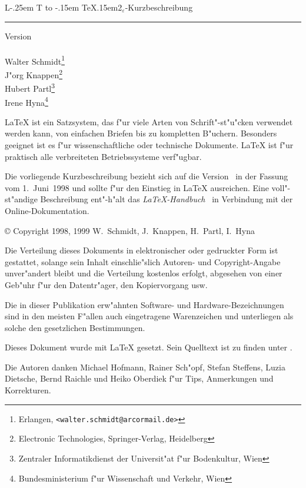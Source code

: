 \documentclass[11pt,a4paper]{article} %
\makeatletter
\DeclareRobustCommand{\sbLaTeXe}{{\fontseries{sbc}\selectfont\boldmath%
        L\kern-.25em%
        {\sbox\z@ T%
         \vbox to\ht\z@{\hbox{\check@mathfonts
                              \fontsize\sf@size\z@
                              \math@fontsfalse\selectfont
                              A}%
                        \vss}%
        }%
        \kern-.15em%
        \TeX\kern.15em2$_{\textstyle\varepsilon}$}}
\newcommand{\manual}{\emph{\LaTeX-Handbuch}~\cite{manual}}
\makeatother
\begin{document}
\begin{titlepage} %
\renewcommand{\thefootnote}{\fnsymbol{footnote}}
{\Huge%
\selectfont
\raggedright
\sbLaTeXe-Kurzbeschreibung
\rule{\textwidth}{0.75pt}
\par
}
\begin{flushleft}
  \normalsize
  \selectfont
  Version \lkver\\
  \lkdate\\[2ex]
  Walter Schmidt\footnote{%
    Erlangen, \texttt{<walter.schmidt@arcormail.de>}}\\
  J"org Knappen\footnote{%
    Electronic Technologies, Springer-Verlag, Heidelberg}\\
  Hubert Partl\footnote{%
    Zentraler Informatikdienst der Universit"at f"ur Bodenkultur, Wien}\\
  Irene Hyna\footnote{%
    Bundesministerium f"ur Wissenschaft und Verkehr, Wien}
\end{flushleft}

\vfill

{\parindent=0cm
\LaTeX{} ist ein Satzsystem, das f"ur viele Arten von
Schrift"-st"u"cken verwendet werden kann, von einfachen Briefen bis zu
kompletten B"uchern.  Besonders geeignet ist es f"ur 
wissenschaftliche oder technische Dokumente. \LaTeX{} ist f"ur 
praktisch alle verbreiteten Betriebssysteme verf"ugbar.
 
Die vorliegende Kurzbeschreibung bezieht sich auf die Version
\LaTeXe\ in der Fassung vom 1.\ Juni~1998 und sollte f"ur den 
Einstieg in \LaTeX{} ausreichen.  
Eine voll"-st"andige Beschreibung ent"-h"alt das \manual{}
in Verbindung mit der Online-Dokumentation.
}
\setcounter{footnote}{0}
\end{titlepage}


{\parindent=0cm\thispagestyle{empty}
\copyright{} Copyright 1998, 1999 W.~Schmidt, J.~Knappen, H.~Partl, I.~Hyna
\bigskip

Die Verteilung dieses Dokuments in elektronischer oder gedruckter
Form ist gestattet, solange sein Inhalt einschlie"slich Autoren- und 
Copyright-Angabe unver"andert bleibt und die Verteilung kostenlos
erfolgt, abgesehen von einer Ge\-b"uhr f"ur den Datentr"ager, den
Kopiervorgang usw.
\bigskip

Die in dieser Publikation erw"ahnten Software- und Hardware-Bezeichnungen sind
in den meisten F"allen auch eingetragene Warenzeichen und unterliegen als
solche den gesetzlichen Bestimmungen.
\bigskip

\vfill

Dieses Dokument wurde mit \LaTeX{} gesetzt.
Sein Quelltext ist zu finden unter
.
\bigskip

Die Autoren danken Michael Hofmann, Rainer Sch"opf, Stefan 
Steffens, Luzia Dietsche, Bernd Raichle und Heiko Oberdiek 
f"ur Tips, Anmerkungen 
und  Korrekturen.
}
\end{document}
